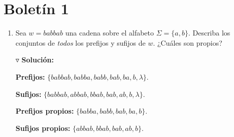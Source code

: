 \documentclass{article}
\begin{document}
\section*{\LARGE{Boletín 1}}
\begin{enumerate}
\item Sea $w = babbab$ una cadena sobre el alfabeto $\Sigma = \{a, b\}$.
  Describa los conjuntos de \textit{todos} los prefijos y sufijos de $w$.
  ¿Cuáles son propios?
  
  $\triangledown$ \textbf{Solución:}
  
  \textbf{Prefijos:} $\{babbab, babba, babb, bab, ba, b, \lambda\}$.
  
  \textbf{Sufijos:} $\{babbab, abbab, bbab, bab, ab, b, \lambda\}$.
  
  \textbf{Prefijos propios:} $\{babba, babb, bab, ba, b\}$.

  \textbf{Sufijos propios:} $\{abbab, bbab, bab, ab, b\}$.
  

\end{enumerate}
\end{document}
